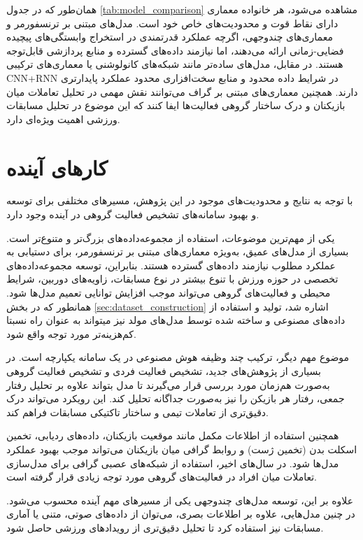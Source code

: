 \documentclass[12pt]{report}
\begin{document}
همان‌طور که در جدول \ref{tab:model_comparison} مشاهده می‌شود، هر خانواده معماری دارای نقاط قوت و محدودیت‌های خاص خود است. مدل‌های مبتنی بر ترنسفورمر و معماری‌های چندوجهی، اگرچه عملکرد قدرتمندی در استخراج وابستگی‌های پیچیده فضایی-زمانی ارائه می‌دهند، اما نیازمند داده‌های گسترده و منابع پردازشی قابل‌توجه هستند. در مقابل، مدل‌های ساده‌تر مانند شبکه‌های کانولوشنی یا معماری‌های ترکیبی CNN+RNN در شرایط داده محدود و منابع سخت‌افزاری محدود عملکرد پایدارتری دارند. همچنین معماری‌های مبتنی بر گراف می‌توانند نقش مهمی در تحلیل تعاملات میان بازیکنان و درک ساختار گروهی فعالیت‌ها ایفا کنند که این موضوع در تحلیل مسابقات ورزشی اهمیت ویژه‌ای دارد.

\clearpage
\section{کارهای آینده}

با توجه به نتایج و محدودیت‌های موجود در این پژوهش، مسیرهای مختلفی برای توسعه و بهبود سامانه‌های تشخیص فعالیت گروهی در آینده وجود دارد.

یکی از مهم‌ترین موضوعات، استفاده از مجموعه‌داده‌های بزرگ‌تر و متنوع‌تر است. بسیاری از مدل‌های عمیق، به‌ویژه معماری‌های مبتنی بر ترنسفورمر، برای دستیابی به عملکرد مطلوب نیازمند داده‌های گسترده هستند. بنابراین، توسعه مجموعه‌داده‌های تخصصی در حوزه ورزش با تنوع بیشتر در نوع مسابقات، زاویه‌های دوربین، شرایط محیطی و فعالیت‌های گروهی می‌تواند موجب افزایش توانایی تعمیم مدل‌ها شود. همانطور که در بخش \ref{sec:dataset_construction} اشاره شد، تولید و استفاده از داده‌های مصنوعی و ساخته شده توسط مدل‌های مولد نیز میتواند به عنوان راه نسبتا کم‌هزینه‌تر مورد توجه واقع شود.

موضوع مهم دیگر، ترکیب چند وظیفه هوش مصنوعی در یک سامانه یکپارچه است. در بسیاری از پژوهش‌های جدید، تشخیص فعالیت فردی و تشخیص فعالیت گروهی به‌صورت هم‌زمان مورد بررسی قرار می‌گیرند تا مدل بتواند علاوه بر تحلیل رفتار جمعی، رفتار هر بازیکن را نیز به‌صورت جداگانه تحلیل کند. این رویکرد می‌تواند درک دقیق‌تری از تعاملات تیمی و ساختار تاکتیکی مسابقات فراهم کند.

همچنین استفاده از اطلاعات مکمل مانند موقعیت بازیکنان، داده‌های ردیابی، تخمین اسکلت بدن (تخمین ژست) و روابط گرافی میان بازیکنان می‌تواند موجب بهبود عملکرد مدل‌ها شود. در سال‌های اخیر، استفاده از شبکه‌های عصبی گرافی برای مدل‌سازی تعاملات میان افراد در فعالیت‌های گروهی مورد توجه زیادی قرار گرفته است.

علاوه بر این، توسعه مدل‌های چندوجهی یکی از مسیرهای مهم آینده محسوب می‌شود. در چنین مدل‌هایی، علاوه بر اطلاعات بصری، می‌توان از داده‌های صوتی، متنی یا آماری مسابقات نیز استفاده کرد تا تحلیل دقیق‌تری از رویدادهای ورزشی حاصل شود.
\end{document}
